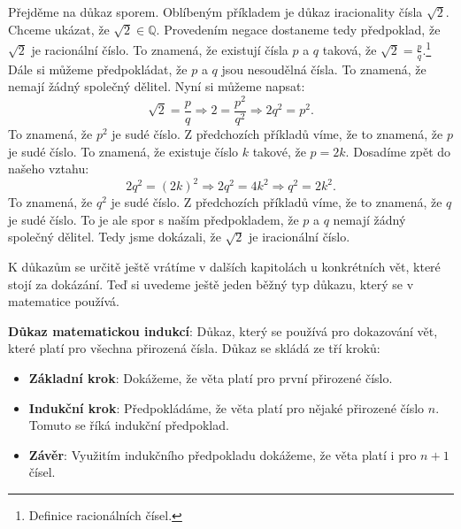 \begin{example}
  Přejděme na důkaz sporem. Oblíbeným příkladem je důkaz iracionality čísla $\sqrt{2}$. Chceme ukázat, že $\sqrt{2}\in\mathbb{Q}$. Provedením negace dostaneme tedy předpoklad, že $\sqrt{2}$ je racionální číslo. To znamená, že existují čísla $p$ a $q$ taková, že $\sqrt{2} = \frac{p}{q}$.\footnote{Definice racionálních čísel.} Dále si můžeme předpokládat, že $p$ a $q$ jsou nesoudělná čísla. To znamená, že nemají žádný společný dělitel. Nyní si můžeme napsat:
  \begin{equation}
    \sqrt{2} = \frac{p}{q} \Rightarrow 2 = \frac{p^2}{q^2} \Rightarrow 2q^2 = p^2.
  \end{equation}
  To znamená, že $p^2$ je sudé číslo. Z předchozích příkladů víme, že to znamená, že $p$ je sudé číslo. To znamená, že existuje číslo $k$ takové, že $p = 2k$. Dosadíme zpět do našeho vztahu:
  \begin{equation}
    2q^2 = (2k)^2 \Rightarrow 2q^2 = 4k^2 \Rightarrow q^2 = 2k^2.
  \end{equation}
  To znamená, že $q^2$ je sudé číslo. Z předchozích příkladů víme, že to znamená, že $q$ je sudé číslo. To je ale spor s naším předpokladem, že $p$ a $q$ nemají žádný společný dělitel. Tedy jsme dokázali, že $\sqrt{2}$ je iracionální číslo.
\end{example}
\begin{definitionbox}
  K důkazům se určitě ještě vrátíme v dalších kapitolách u konkrétních vět, které stojí za dokázání. Teď si uvedeme ještě jeden běžný typ důkazu, který se v matematice používá.

  \vspace{0.2cm}

  \textbf{Důkaz matematickou indukcí}: Důkaz, který se používá pro dokazování vět, které platí pro všechna přirozená čísla. Důkaz se skládá ze tří kroků:
  \begin{itemize}
    \item \textbf{Základní krok}: Dokážeme, že věta platí pro první přirozené číslo.
    \item \textbf{Indukční krok}: Předpokládáme, že věta platí pro nějaké přirozené číslo $n$. Tomuto se říká indukční předpoklad.
    \item \textbf{Závěr}: Využitím indukčního předpokladu dokážeme, že věta platí i pro $n+1$ čísel.
  \end{itemize}
\end{definitionbox}

